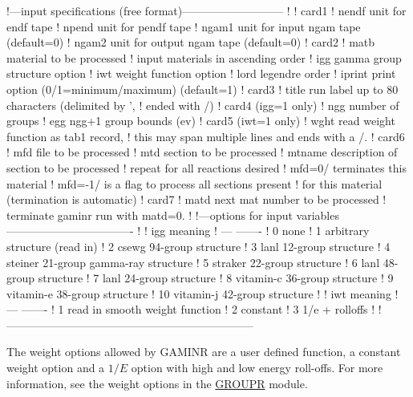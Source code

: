 \small
\begin{ccode}

   !---input specifications (free format)---------------------------
   !
   ! card1
   !    nendf   unit for endf tape
   !    npend   unit for pendf tape
   !    ngam1   unit for input ngam tape (default=0)
   !    ngam2   unit for output ngam tape (default=0)
   ! card2
   !    matb    material to be processed
   !            input materials in ascending order
   !    igg     gamma group structure option
   !    iwt     weight function option
   !    lord    legendre order
   !    iprint  print option (0/1=minimum/maximum) (default=1)
   ! card3
   !    title   run label up to 80 characters (delimited by ',
   !            ended with /)
   ! card4      (igg=1 only)
   !    ngg     number of groups
   !    egg     ngg+1 group bounds (ev)
   ! card5      (iwt=1 only)
   !    wght    read weight function as tab1 record,
   !            this may span multiple lines and ends with a /.
   ! card6
   !    mfd     file to be processed
   !    mtd     section to be processed
   !    mtname  description of section to be processed
   !            repeat for all reactions desired
   !            mfd=0/ terminates this material
   !            mfd=-1/ is a flag to process all sections present
   !            for this material  (termination is automatic)
   ! card7
   !    matd    next mat number to be processed
   !            terminate gaminr run with matd=0.
   !
   !---options for input variables----------------------------------
   !
   !        igg     meaning
   !        ---     -------
   !         0      none
   !         1      arbitrary structure (read in)
   !         2      csewg 94-group structure
   !         3      lanl 12-group structure
   !         4      steiner 21-group gamma-ray structure
   !         5      straker 22-group structure
   !         6      lanl 48-group structure
   !         7      lanl 24-group structure
   !         8      vitamin-c 36-group structure
   !         9      vitamin-e 38-group structure
   !         10      vitamin-j 42-group structure
   !
   !        iwt     meaning
   !        ---     -------
   !         1      read in smooth weight function
   !         2      constant
   !         3      1/e + rolloffs
   !
   !------------------------------------------------------------------

\end{ccode}
\normalsize

The weight options allowed by GAMINR are a user defined function, a constant
weight option and a $1/E$ option with high and low energy roll-offs. For more
information, see the weight options in the \hyperlink{sGROUPRhy}{GROUPR} module.

